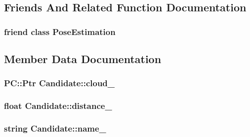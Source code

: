 \subsection{Friends And Related Function Documentation}
\hypertarget{classCandidate_acc93828d970ba58835be2e8221c7a669}{
\subsubsection[{Pose\-Estimation}]{\setlength{\rightskip}{0pt plus 5cm}friend class {\bf Pose\-Estimation}\hspace{0.3cm}{\ttfamily [friend]}}}\label{classCandidate_acc93828d970ba58835be2e8221c7a669}


\subsection{Member Data Documentation}
\hypertarget{classCandidate_a76f70de142b2d01bf2e5fa8243dd9b2f}{
\subsubsection[{cloud\-\_\-}]{\setlength{\rightskip}{0pt plus 5cm}P\-C\-::\-Ptr Candidate\-::cloud\-\_\-\hspace{0.3cm}{\ttfamily [private]}}}\label{classCandidate_a76f70de142b2d01bf2e5fa8243dd9b2f}
\hypertarget{classCandidate_a4c57f77041f7729849ff4acf86071abf}{
\subsubsection[{distance\-\_\-}]{\setlength{\rightskip}{0pt plus 5cm}float Candidate\-::distance\-\_\-\hspace{0.3cm}{\ttfamily [private]}}}\label{classCandidate_a4c57f77041f7729849ff4acf86071abf}
\hypertarget{classCandidate_a2d2bca2f29137c8d341202d4d4e3aa04}{
\subsubsection[{name\-\_\-}]{\setlength{\rightskip}{0pt plus 5cm}string Candidate\-::name\-\_\-\hspace{0.3cm}{\ttfamily [private]}}}\label{classCandidate_a2d2bca2f29137c8d341202d4d4e3aa04}
